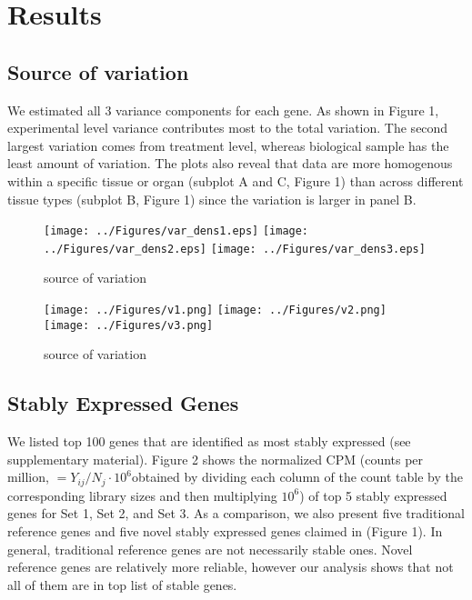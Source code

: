 \documentclass[11pt, a4paper]{article}
\begin{document}
 \section{Results}

  \subsection{Source of variation}
 We estimated all 3 variance components for each gene. As shown in Figure 1, experimental level variance contributes most to the total variation.  The second largest variation comes from treatment level, whereas biological sample has the least amount of variation.  The plots also reveal that data are more homogenous within a specific tissue or organ (subplot A and C, Figure 1) than across different tissue types (subplot B, Figure 1) since the variation is larger in panel B.  
 \begin{figure}[h!]
\begin{center}\label{Fig1}
\texttt{[image: ../Figures/var\_dens1.eps]}
\texttt{[image: ../Figures/var\_dens2.eps]}
\texttt{[image: ../Figures/var\_dens3.eps]}
\caption{\label{tag:scaled_diss} source of variation}
\end{center}
\end{figure} 


 \begin{figure}[h!]
\begin{center}\label{Fig1}
\texttt{[image: ../Figures/v1.png]}
\texttt{[image: ../Figures/v2.png]}
\texttt{[image: ../Figures/v3.png]}
\caption{\label{tag:scaled_diss} source of variation}
\end{center}
\end{figure} 

  \subsection{Stably Expressed Genes}
 We listed top 100 genes that are identified as most stably expressed (see supplementary material). Figure 2 shows the normalized CPM (counts per million, $=Y_{ij}/N_j\cdot 10^6$obtained by dividing each column of the count table by the corresponding library sizes and then multiplying $10^6$)\citep{anders2013count} of top 5 stably expressed genes for Set 1, Set 2, and Set 3. As a comparison, we also present five traditional reference genes and five novel stably expressed genes claimed in \cite{czechowski2005genome} (Figure 1). In general, traditional reference genes are not necessarily stable ones.  Novel reference genes are relatively more reliable,  however our analysis shows that not all of them are in top list of stable genes. 
\end{document}
